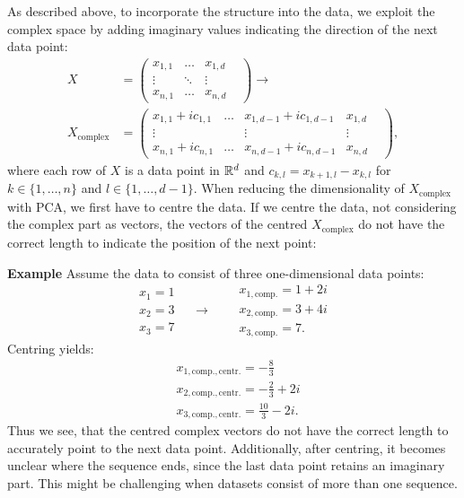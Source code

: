 \documentclass[pdftex,12pt,a4paper]{report}
\begin{document}
As described above, to incorporate the structure into the data, we exploit the complex space by adding imaginary values indicating the direction of the next data point:
\begin{align*}
    X & = 
    \begin{pmatrix}
        x_{1,1} & \dots & x_{1,d} \\
        \vdots &  \ddots & \vdots & \\
        x_{n,1} & \dots & x_{n,d}
    \end{pmatrix}
    \rightarrow \\
     X_{\mathrm{complex}} & =
    \begin{pmatrix}
        x_{1,1} + i c_{1,1} & \dots & x_{1,d - 1} + i c_{1,d - 1} & x_{1,d} \\
        \vdots &  & \vdots &\vdots & \\
        x_{n,1} + i c_{n,1} & \dots & x_{n,d - 1} + i c_{n,d - 1} &x_{n,d}
    \end{pmatrix},
\end{align*}
where each row of $X$ is a data point in $\mathbb{R}^d$ and $c_{k,l} = x_{k + 1, l} - x_{k,l}$ for $k \in \{1,\dots, n \}$ and $l \in \{1, \dots, d - 1\}$. 
When reducing the dimensionality of $X_{\mathrm{complex}}$ with PCA, we first have to centre the data.
If we centre the data, not considering the complex part as vectors, the vectors of the centred $X_{\mathrm{complex}}$ do not have the correct length to indicate the position of the next point:

\begin{leftbar}
    \textbf{Example} Assume the data to consist of three one-dimensional data points:
    \begin{equation*}
        \begin{split}
            x_1 = 1 \\
            x_2 = 3 \\
            x_3 = 7    
        \end{split}
        \quad\rightarrow\quad
        \begin{split}
            &x_{1, \mathrm{comp.}} = 1 + 2i \\
            &x_{2, \mathrm{comp.}} = 3 + 4i \\
            &x_{3, \mathrm{comp.}} = 7.
        \end{split}
    \end{equation*}
    Centring yields:
    \begin{align*}
        &x_{1, \mathrm{comp., centr.}} = -\frac{8}{3}  \\
        &x_{2, \mathrm{comp., centr.}} = -\frac{2}{3} + 2i \\
        &x_{3, \mathrm{comp., centr.}} = \frac{10}{3} - 2i.
    \end{align*}
    Thus we see, that the centred complex vectors do not have the correct length to accurately point to the next data point.
    Additionally, after centring, it becomes unclear where the sequence ends, since the last data point retains an imaginary part.
    This might be challenging when datasets consist of more than one sequence.
\end{leftbar}
\end{document}
